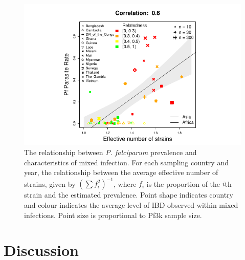 \documentclass[9pt,lineno]{elife}
\begin{document}
\begin{figure}[h]
  \centering{}
  \includegraphics[width=\textwidth]{Fig5.pdf}
  \caption{The relationship between {\it P. falciparum} prevalence and characteristics of mixed infection. For each sampling country and year, the relationship between the average effective number of strains, given by $(\sum f_i^2)^{-1}$, where $f_i$ is the proportion of the $i$th strain and the estimated prevalence.  Point shape indicates country and colour indicates the average level of IBD observed within mixed infections. Point size is proportional to Pf3k sample size.}
  \label{fig:model}
\end{figure}


\section{Discussion}
\end{document}
